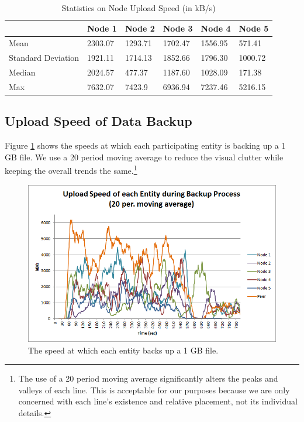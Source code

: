 \documentclass[12pt]{report}
\begin{document}
\begin{table}
\begin{center}
    \begin{tabular}{| l | l | l | l | l | l |}
    \hline
    & Node 1 & Node 2 & Node 3 & Node 4 & Node 5 \\ \hline
    Mean & 2303.07 & 1293.71 & 1702.47 & 1556.95 & 571.41 \\ \hline
    Standard Deviation & 1921.11 & 1714.13 & 1852.66 & 1796.30 & 1000.72 \\ \hline
    Median & 2024.57 & 477.37 & 1187.60 & 1028.09 & 171.38 \\ \hline
    Max & 7632.07 & 7423.9 & 6936.94 & 7237.46 & 5216.15 \\ \hline
    \end{tabular}
    \caption{Statistics on Node Upload Speed (in kB/s)}
    \label{tab:NodeRecoverySpeed}
\end{center}
\end{table}

\subsection{Upload Speed of Data Backup} \label{subsec:UploadSpeedofDataBackup}

Figure \ref{fig:EntityBackupSpeed} shows the speeds at which each participating entity is backing up a 1 GB file.  We use a 20 period moving average to reduce the visual clutter while keeping the overall trends the same.\footnote{The use of a 20 period moving average significantly alters the peaks and valleys of each line. This is acceptable for our purposes because we are only concerned with each line's existence and relative placement, not its individual details.}

\begin{figure}
  \centerline{\includegraphics[scale=1]{figures/EntityBackupSpeed}}
  \caption{The speed at which each entity backs up a 1 GB file. \label{fig:EntityBackupSpeed}}
\end{figure}
\end{document}
